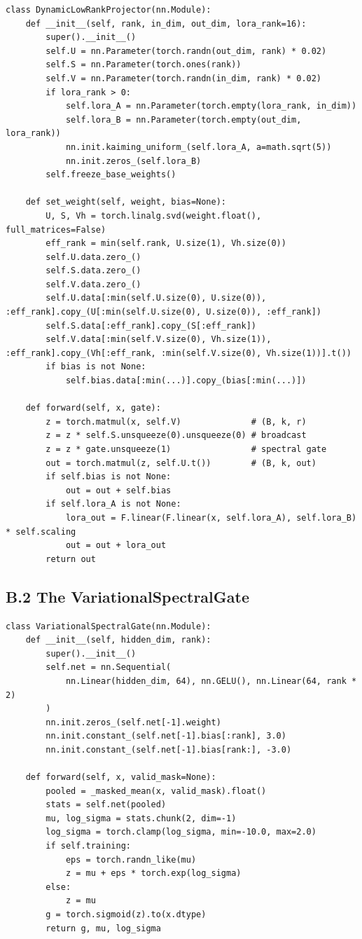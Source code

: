 \begin{lstlisting}
class DynamicLowRankProjector(nn.Module):
    def __init__(self, rank, in_dim, out_dim, lora_rank=16):
        super().__init__()
        self.U = nn.Parameter(torch.randn(out_dim, rank) * 0.02)
        self.S = nn.Parameter(torch.ones(rank))
        self.V = nn.Parameter(torch.randn(in_dim, rank) * 0.02)
        if lora_rank > 0:
            self.lora_A = nn.Parameter(torch.empty(lora_rank, in_dim))
            self.lora_B = nn.Parameter(torch.empty(out_dim, lora_rank))
            nn.init.kaiming_uniform_(self.lora_A, a=math.sqrt(5))
            nn.init.zeros_(self.lora_B)
        self.freeze_base_weights()
    
    def set_weight(self, weight, bias=None):
        U, S, Vh = torch.linalg.svd(weight.float(), full_matrices=False)
        eff_rank = min(self.rank, U.size(1), Vh.size(0))
        self.U.data.zero_()
        self.S.data.zero_()
        self.V.data.zero_()
        self.U.data[:min(self.U.size(0), U.size(0)), :eff_rank].copy_(U[:min(self.U.size(0), U.size(0)), :eff_rank])
        self.S.data[:eff_rank].copy_(S[:eff_rank])
        self.V.data[:min(self.V.size(0), Vh.size(1)), :eff_rank].copy_(Vh[:eff_rank, :min(self.V.size(0), Vh.size(1))].t())
        if bias is not None:
            self.bias.data[:min(...)].copy_(bias[:min(...)])
    
    def forward(self, x, gate):
        z = torch.matmul(x, self.V)              # (B, k, r)
        z = z * self.S.unsqueeze(0).unsqueeze(0) # broadcast
        z = z * gate.unsqueeze(1)                # spectral gate
        out = torch.matmul(z, self.U.t())        # (B, k, out)
        if self.bias is not None:
            out = out + self.bias
        if self.lora_A is not None:
            lora_out = F.linear(F.linear(x, self.lora_A), self.lora_B) * self.scaling
            out = out + lora_out
        return out
\end{lstlisting}

\subsection{B.2 The VariationalSpectralGate}

\begin{lstlisting}
class VariationalSpectralGate(nn.Module):
    def __init__(self, hidden_dim, rank):
        super().__init__()
        self.net = nn.Sequential(
            nn.Linear(hidden_dim, 64), nn.GELU(), nn.Linear(64, rank * 2)
        )
        nn.init.zeros_(self.net[-1].weight)
        nn.init.constant_(self.net[-1].bias[:rank], 3.0)
        nn.init.constant_(self.net[-1].bias[rank:], -3.0)
    
    def forward(self, x, valid_mask=None):
        pooled = _masked_mean(x, valid_mask).float()
        stats = self.net(pooled)
        mu, log_sigma = stats.chunk(2, dim=-1)
        log_sigma = torch.clamp(log_sigma, min=-10.0, max=2.0)
        if self.training:
            eps = torch.randn_like(mu)
            z = mu + eps * torch.exp(log_sigma)
        else:
            z = mu
        g = torch.sigmoid(z).to(x.dtype)
        return g, mu, log_sigma
\end{lstlisting}

